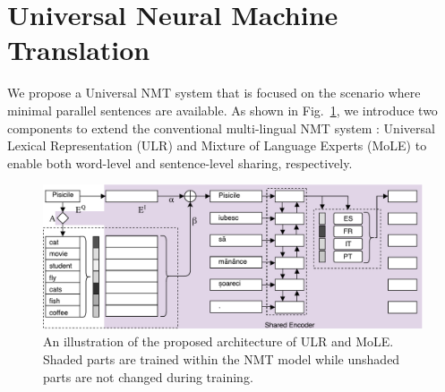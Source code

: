 
\section{Universal Neural Machine Translation}
We propose a Universal NMT system that is focused on the scenario where minimal parallel sentences are available. 
As shown in Fig.~\ref{cp5.fig.model}, we introduce two components to extend the conventional multi-lingual NMT system \cite{johnson2016google}: Universal Lexical Representation (ULR) and Mixture of Language Experts (MoLE) to enable both word-level and sentence-level sharing, respectively.
\begin{figure}[hptb]
	\centering
	\includegraphics[width=\linewidth]{figs/ulr/model2x}
      \caption{\label{cp5.fig.model} An illustration of the proposed architecture of ULR and MoLE. Shaded parts are trained within the NMT model while unshaded parts are not changed during  training.}
  \end{figure}

